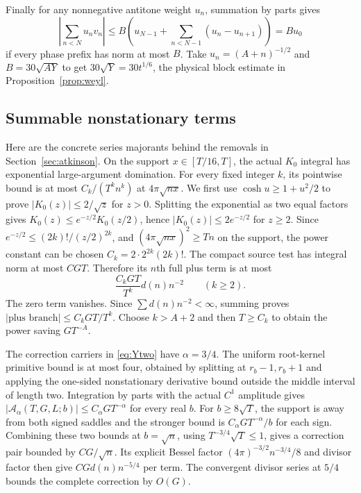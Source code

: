\documentclass[11pt,a4paper]{article}
\numberwithin{equation}{section}
\theoremstyle{definition}
\begin{document}
Finally for any nonnegative antitone weight $u_n$, summation by parts gives
\[
 \left|\sum_{n<N}u_nv_n\right|
 \le B\left(u_{N-1}+\sum_{n<N-1}(u_n-u_{n+1})\right)=Bu_0
\]
if every phase prefix has norm at most $B$. Take
$u_n=(A+n)^{-1/2}$ and $B=30\sqrt{AY}$ to get
$30\sqrt Y=30t^{1/6}$, the physical block estimate in
Proposition~\ref{prop:weyl}.

\subsection{Summable nonstationary terms}
Here are the concrete series majorants behind the removals in
Section~\ref{sec:atkinson}.
On the support $x\in[T/16,T]$, the actual $K_0$ integral has exponential
large-argument domination. For every fixed integer $k$, its pointwise
bound is at most $C_k/(T^kn^k)$ at $4\pi\sqrt{nx}$.
We first use $\cosh u\ge1+u^2/2$ to prove
$|K_0(z)|\le2/\sqrt z$ for $z>0$.
Splitting the exponential as two equal factors gives
$K_0(z)\le e^{-z/2}K_0(z/2)$, hence $|K_0(z)|\le2e^{-z/2}$ for $z\ge2$.
Since $e^{-z/2}\le(2k)!/(z/2)^{2k}$, and
$(4\pi\sqrt{nx})^2\ge Tn$ on the support, the power constant can be chosen
$C_k=2\cdot2^{2k}(2k)!$. The compact source test has integral norm at most
$CGT$. Therefore its $n$th full plus term is at most
\[
 \frac{C_kGT}{T^k}d(n)n^{-2}\qquad(k\ge2).
\]
The zero term vanishes. Since $\sum d(n)n^{-2}<\infty$, summing proves
$|\text{plus branch}|\le C_kGT/T^k$. Choose $k>A+2$ and then $T\ge C_k$
to obtain the power saving $GT^{-A}$.

The correction carriers in \eqref{eq:Ytwo} have $\alpha=3/4$.
The uniform root-kernel primitive bound is at most four, obtained by splitting
at $r_b-1,r_b+1$ and applying the one-sided nonstationary derivative bound
outside the middle interval of length two. Integration by parts with the
actual $C^1$ amplitude gives
$|\mathcal A_\alpha(T,G,L;b)|\le C_\alpha GT^{-\alpha}$ for every real $b$.
For $b\ge8\sqrt T$, the support is away from both signed saddles and the
stronger bound is $C_\alpha GT^{-\alpha}/b$ for each sign.
Combining these two bounds at $b=\sqrt n$, using
$T^{-3/4}\sqrt T\le1$, gives a correction pair bounded by $CG/\sqrt n$.
Its explicit Bessel factor $(4\pi)^{-3/2}n^{-3/4}/8$ and divisor factor
then give $CGd(n)n^{-5/4}$ per term. The convergent divisor series at
$5/4$ bounds the complete correction by $O(G)$.
\end{document}

